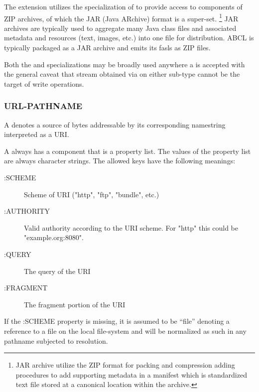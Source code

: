 \documentclass[10pt]{book}
\begin{document}
The  extension utilizes the specialization of
 to provide access to components of
\textsc{ZIP} archives, of which the \textsc{JAR} (Java ARchive) format
is a super-set.  \footnote{JAR archive utilize the ZIP format for
packing and compression adding procedures to add supporting metadata
in a manifest which is standardized text file stored at a canonical
location within the archive.}  \textsc{JAR} archives are typically
used to aggregate many Java class files and associated metadata and
resources (text, images, etc.) into one file for distribution.
\textsc{ABCL} is typically packaged as a \textsc{JAR} archive and
emits its fasls as \textsc{ZIP} files.

Both the  and 
specializations may be broadly used anywhere a  is
accepted with the general caveat that stream obtained via
 on either sub-type cannot be the target of write
operations.

\subsubsection{URL-PATHNAME}
\label{EXTENSIONS:URL-PATHNAME}

A  denotes a source of bytes addressable by its
corresponding namestring interpreted as a \textsc{URI}.

A  always has a  component that is a
property list.  The values of the  property list are always
character strings.  The allowed keys have the following meanings:

\begin{description}
\item[:SCHEME] Scheme of URI ("http", "ftp", "bundle", etc.)
\item[:AUTHORITY] Valid authority according to the URI scheme.  For
  "http" this could be "example.org:8080". 
\item[:QUERY] The query of the \textsc{URI} 
\item[:FRAGMENT] The fragment portion of the \textsc{URI}
\end{description}

If the \textsc{:SCHEME} property is missing, it is assumed to be
``file'' denoting a reference to a file on the local file-system and
will be normalized as such in any pathname subjected to
 resolution.
  
\end{document}

